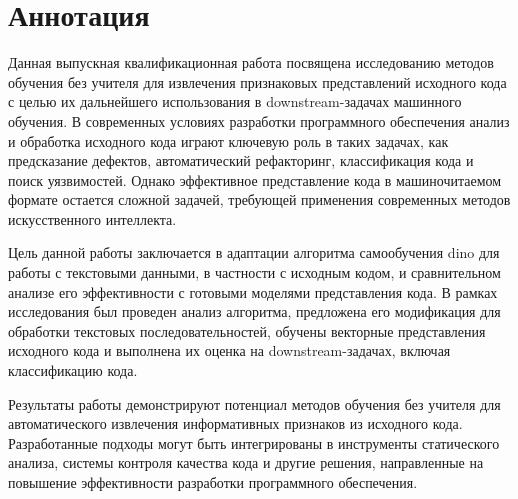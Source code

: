 \documentclass[../document.tex]{subfiles}
\begin{document}
    \section*{Аннотация}
    \par Данная выпускная квалификационная работа посвящена исследованию методов обучения без учителя для извлечения признаковых представлений исходного кода с целью их дальнейшего использования в downstream-задачах машинного обучения. В современных условиях разработки программного обеспечения анализ и обработка исходного кода играют ключевую роль в таких задачах, как предсказание дефектов, автоматический рефакторинг, классификация кода и поиск уязвимостей. Однако эффективное представление кода в машиночитаемом формате остается сложной задачей, требующей применения современных методов искусственного интеллекта.
    \par Цель данной работы заключается в адаптации алгоритма самообучения \gls{dino} для работы с текстовыми данными, в частности с исходным кодом, и сравнительном анализе его эффективности с готовыми моделями представления кода. В рамках исследования был проведен анализ алгоритма, предложена его модификация для обработки текстовых последовательностей, обучены векторные представления исходного кода и выполнена их оценка на downstream-задачах, включая классификацию кода.
    \par Результаты работы демонстрируют потенциал методов обучения без учителя для автоматического извлечения информативных признаков из исходного кода. Разработанные подходы могут быть интегрированы в инструменты статического анализа, системы контроля качества кода и другие решения, направленные на повышение эффективности разработки программного обеспечения.
\end{document}
